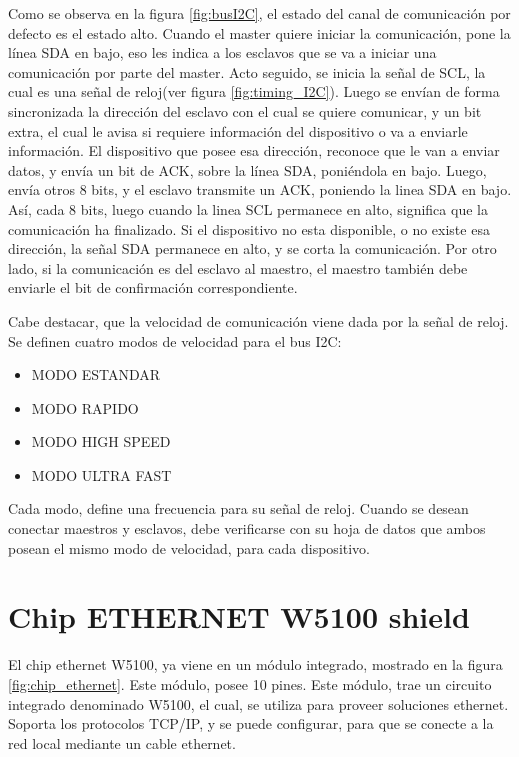 Como se observa en la figura \ref{fig:busI2C}, el estado del canal de comunicación por defecto es el estado alto. Cuando el master quiere iniciar la comunicación, pone la línea SDA en bajo, eso les indica a los esclavos que se va a iniciar una comunicación por parte del master. Acto seguido, se inicia la señal de SCL, la cual es una señal de reloj(ver figura \ref{fig:timing_I2C}). Luego se envían de forma sincronizada la dirección del esclavo con el cual se quiere comunicar, y un bit extra, el cual le avisa si requiere información del dispositivo o va a enviarle información. El dispositivo que posee esa dirección, reconoce que le van a enviar datos, y envía un bit de ACK, sobre la línea SDA, poniéndola en bajo. Luego, envía otros 8 bits, y el esclavo transmite un ACK, poniendo la linea SDA en bajo. Así, cada 8 bits, luego cuando la linea SCL permanece en alto, significa que la comunicación ha finalizado. Si el dispositivo no esta disponible, o no existe esa dirección, la señal SDA permanece en alto, y se corta la comunicación. Por otro lado, si la comunicación es del esclavo al maestro, el maestro también debe enviarle el bit de confirmación correspondiente.  

Cabe destacar, que la velocidad de comunicación viene dada por la señal de reloj. Se definen cuatro modos de velocidad para el bus I2C: 
\begin{itemize}
	\item MODO ESTANDAR
	\item MODO RAPIDO 
	\item MODO HIGH SPEED
	\item MODO ULTRA FAST 
\end{itemize}

Cada modo, define una frecuencia para su señal de reloj. Cuando se desean conectar maestros y esclavos, debe verificarse con su hoja de datos que ambos posean el mismo modo de velocidad, para cada dispositivo. 


\section{Chip ETHERNET W5100 shield }

El chip ethernet W5100, ya viene en un módulo integrado, mostrado en la figura \ref{fig:chip_ethernet}. Este módulo, posee 10 pines. Este módulo, trae un circuito integrado denominado W5100, el cual, se utiliza para proveer soluciones ethernet. Soporta los protocolos TCP/IP, y se puede configurar, para que se conecte a la red local mediante un cable ethernet. 

